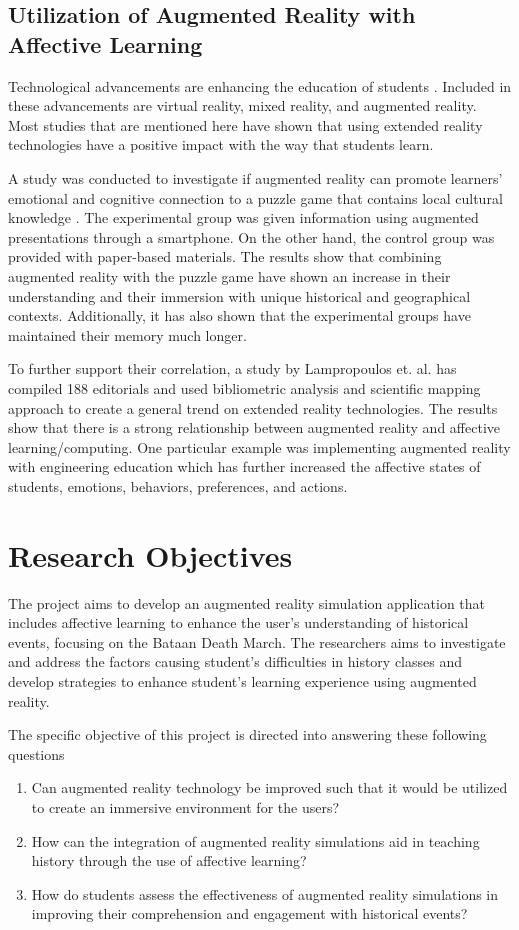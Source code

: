 \subsection{Utilization of Augmented Reality with Affective Learning}
Technological advancements are enhancing the education of students \cite{lamp2024}. Included in these advancements are virtual reality, mixed reality, and augmented reality. Most studies that are mentioned here have shown that using extended reality technologies have a positive impact with the way that students learn.

A study was conducted to investigate if augmented reality can promote learners' emotional and cognitive connection to a puzzle game that contains local cultural knowledge \cite{tsai2024}. The experimental group was given information using augmented presentations through a smartphone. On the other hand, the control group was provided with paper-based materials. The results show that combining augmented reality with the puzzle game have shown an increase in their understanding and their immersion with unique historical and geographical contexts. Additionally, it has also shown that the experimental groups have maintained their memory much longer.

To further support their correlation, a study by Lampropoulos et. al. has compiled 188 editorials and used bibliometric analysis and scientific mapping approach to create a general trend on extended reality technologies. The results show that there is a strong relationship between augmented reality and affective learning/computing. One particular example was implementing augmented reality with engineering education which has further increased the affective states of students, emotions, behaviors, preferences, and actions.


\section{Research Objectives}
The project aims to develop an augmented reality simulation application that includes affective learning to enhance the user's understanding of historical events, focusing on the Bataan Death March. The researchers aims to investigate and address the factors causing student's difficulties in history classes and develop strategies to enhance student's learning experience using augmented reality.

The specific objective of this project is directed into answering these following questions
\begin{enumerate}
    \item Can augmented reality technology be improved such that it would be utilized to create an immersive environment for the users?
    \item How can the integration of augmented reality simulations aid in teaching history through the use of affective learning?
    \item How do students assess the effectiveness of augmented reality simulations in improving their comprehension and engagement with historical events? 
\end{enumerate}

